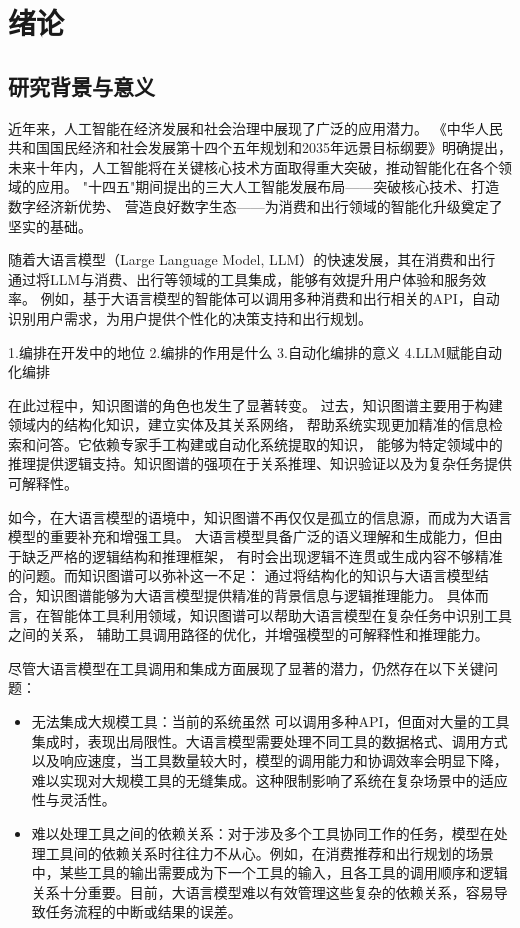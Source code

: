 
\chapter{绪论}

\section{研究背景与意义}

近年来，人工智能在经济发展和社会治理中展现了广泛的应用潜力。
《中华人民共和国国民经济和社会发展第十四个五年规划和2035年远景目标纲要》明确提出，
未来十年内，人工智能将在关键核心技术方面取得重大突破，推动智能化在各个领域的应用。
"十四五"期间提出的三大人工智能发展布局——突破核心技术、打造数字经济新优势、
营造良好数字生态——为消费和出行领域的智能化升级奠定了坚实的基础。

随着大语言模型（Large Language Model, LLM）的快速发展，其在消费和出行
通过将LLM与消费、出行等领域的工具集成，能够有效提升用户体验和服务效率。
例如，基于大语言模型的智能体可以调用多种消费和出行相关的API，自动识别用户需求，为用户提供个性化的决策支持和出行规划。

1.编排在开发中的地位
2.编排的作用是什么
3.自动化编排的意义
4.LLM赋能自动化编排


在此过程中，知识图谱的角色也发生了显著转变。
过去，知识图谱主要用于构建领域内的结构化知识，建立实体及其关系网络，
帮助系统实现更加精准的信息检索和问答。它依赖专家手工构建或自动化系统提取的知识，
能够为特定领域中的推理提供逻辑支持。知识图谱的强项在于关系推理、知识验证以及为复杂任务提供可解释性。

如今，在大语言模型的语境中，知识图谱不再仅仅是孤立的信息源，而成为大语言模型的重要补充和增强工具。
大语言模型具备广泛的语义理解和生成能力，但由于缺乏严格的逻辑结构和推理框架，
有时会出现逻辑不连贯或生成内容不够精准的问题。而知识图谱可以弥补这一不足：
通过将结构化的知识与大语言模型结合，知识图谱能够为大语言模型提供精准的背景信息与逻辑推理能力。
具体而言，在智能体工具利用领域，知识图谱可以帮助大语言模型在复杂任务中识别工具之间的关系，
辅助工具调用路径的优化，并增强模型的可解释性和推理能力。

尽管大语言模型在工具调用和集成方面展现了显著的潜力，仍然存在以下关键问题：

\begin{itemize}
    \item 无法集成大规模工具：当前的系统虽然 可以调用多种API，但面对大量的工具集成时，表现出局限性。大语言模型需要处理不同工具的数据格式、调用方式以及响应速度，当工具数量较大时，模型的调用能力和协调效率会明显下降，难以实现对大规模工具的无缝集成。这种限制影响了系统在复杂场景中的适应性与灵活性。
    \item 难以处理工具之间的依赖关系：对于涉及多个工具协同工作的任务，模型在处理工具间的依赖关系时往往力不从心。例如，在消费推荐和出行规划的场景中，某些工具的输出需要成为下一个工具的输入，且各工具的调用顺序和逻辑关系十分重要。目前，大语言模型难以有效管理这些复杂的依赖关系，容易导致任务流程的中断或结果的误差。
\end{itemize}

